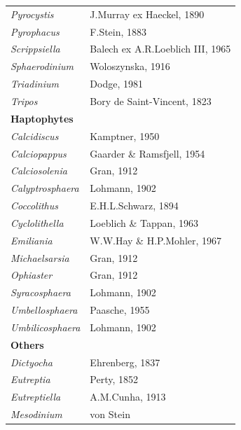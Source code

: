 \documentclass[draft]{agujournal2019}
\begin{document}
\begin{table}
\begin{tabular}{@{}ll@{}}
\textit{Pyrocystis}        & J.Murray ex Haeckel, 1890                                  \\
\textit{Pyrophacus}        & F.Stein, 1883                                              \\
\textit{Scrippsiella}      & Balech ex A.R.Loeblich III, 1965                           \\
\textit{Sphaerodinium}     & Woloszynska, 1916                                          \\
\textit{Triadinium}        & Dodge, 1981                                                \\
\textit{Tripos}            & Bory de Saint-Vincent, 1823                                \\
\textbf{Haptophytes}        &                                                            \\
\textit{Calcidiscus}       & Kamptner, 1950                                             \\
\textit{Calciopappus}      & Gaarder \& Ramsfjell, 1954                                 \\
\textit{Calciosolenia}     & Gran, 1912                                                 \\
\textit{Calyptrosphaera}   & Lohmann, 1902                                              \\
\textit{Coccolithus}       & E.H.L.Schwarz, 1894                                        \\
\textit{Cyclolithella}     & Loeblich \& Tappan, 1963                                   \\
\textit{Emiliania}         & W.W.Hay \& H.P.Mohler, 1967                                \\
\textit{Michaelsarsia}     & Gran, 1912                                                 \\
\textit{Ophiaster}         & Gran, 1912                                                 \\
\textit{Syracosphaera}     & Lohmann, 1902                                              \\
\textit{Umbellosphaera}    & Paasche, 1955                                              \\
\textit{Umbilicosphaera}   & Lohmann, 1902                                              \\
\textbf{Others}            &                                                            \\
\textit{Dictyocha}         & Ehrenberg, 1837                                            \\
\textit{Eutreptia}         & Perty, 1852                                                \\
\textit{Eutreptiella}      & A.M.Cunha, 1913                                            \\
\textit{Mesodinium}        & von Stein                                                 
\end{tabular}
\end{table}
\end{document}
